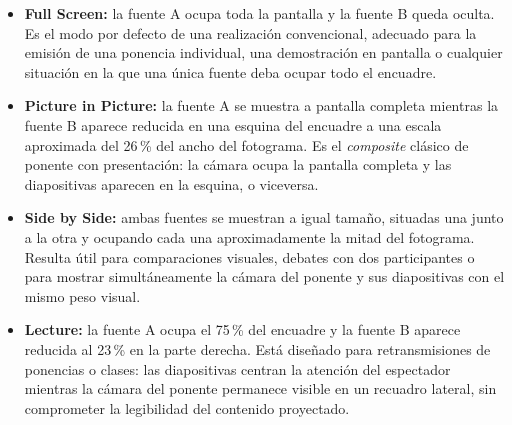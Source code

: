 \begin{itemize}
  \item \textbf{Full Screen:} la fuente A ocupa toda la pantalla y la fuente B
        queda oculta. Es el modo por defecto de una realización convencional, adecuado
        para la emisión de una ponencia individual, una demostración en pantalla o
        cualquier situación en la que una única fuente deba ocupar todo el encuadre.

  \item \textbf{Picture in Picture:} la fuente A se muestra a pantalla
        completa mientras la fuente B aparece reducida en una esquina del encuadre a
        una escala aproximada del 26\,\% del ancho del fotograma. Es el \textit{composite}
        clásico de ponente con presentación: la cámara ocupa la pantalla completa y
        las diapositivas aparecen en la esquina, o viceversa.

  \item \textbf{Side by Side:} ambas fuentes se muestran a igual tamaño, situadas
        una junto a la otra y ocupando cada una aproximadamente la mitad del fotograma.
        Resulta útil para comparaciones visuales, debates con dos participantes o para
        mostrar simultáneamente la cámara del ponente y sus diapositivas con el mismo
        peso visual.

  \item \textbf{Lecture:} la fuente A ocupa el 75\,\% del encuadre y la fuente B
        aparece reducida al 23\,\% en la parte derecha. Está diseñado para
        retransmisiones de ponencias o clases: las diapositivas centran la atención
        del espectador mientras la cámara del ponente permanece visible en un recuadro
        lateral, sin comprometer la legibilidad del contenido proyectado.
\end{itemize}

